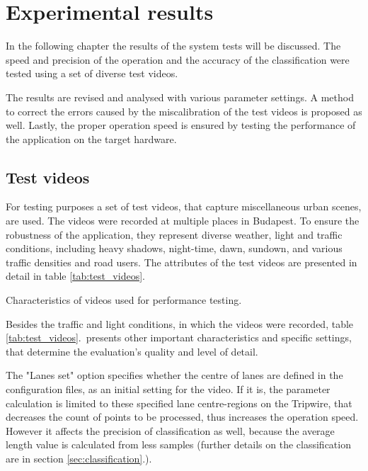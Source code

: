 \chapter{Experimental results}\label{chap:Tests}
In the following chapter the results of the system tests will be discussed. 
The speed and precision of the operation and the accuracy of the classification were tested using a set of diverse test videos.

The results are revised and analysed with various parameter settings.
A method to correct the errors caused by the miscalibration of the test videos is proposed as well.
Lastly, the proper operation speed is ensured by testing the performance of the application on the target hardware.

\section{Test videos}\label{sec:test_videos}
For testing purposes a set of test videos, that capture miscellaneous urban scenes, are used.
The videos were recorded at multiple places in Budapest.
To ensure the robustness of the application, they represent diverse weather, light and traffic conditions, including heavy shadows, night-time, dawn, sundown, and various traffic densities and road users.
The attributes of the test videos are presented in detail in table \ref{tab:test_videos}.

\begin{table}[!h]
	\begin{adjustbox}{center}
	\end{adjustbox}
	\caption{Characteristics of videos used for performance testing.}
	\label{tab:test_videos}
\end{table}

Besides the traffic and light conditions, in which the videos were recorded, table \ref{tab:test_videos}.~presents other important characteristics and specific settings, that determine the evaluation's quality and level of detail.

The "Lanes set" option specifies whether the centre of lanes are defined in the configuration files, as an initial setting for the video.
If it is, the parameter calculation is limited to these specified lane centre-regions on the Tripwire, that decreases the count of points to be processed, thus increases the operation speed.
However it affects the precision of classification as well, because the average length value is calculated from less samples (further details on the classification are in section \ref{sec:classification}.).

